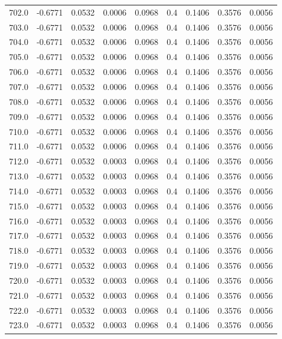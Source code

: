 \begin{longtable}{lrrrrrrrr}
702.0 & -0.6771 & 0.0532 & 0.0006 & 0.0968 & 0.4 & 0.1406 & 0.3576 & 0.0056 \\
703.0 & -0.6771 & 0.0532 & 0.0006 & 0.0968 & 0.4 & 0.1406 & 0.3576 & 0.0056 \\
704.0 & -0.6771 & 0.0532 & 0.0006 & 0.0968 & 0.4 & 0.1406 & 0.3576 & 0.0056 \\
705.0 & -0.6771 & 0.0532 & 0.0006 & 0.0968 & 0.4 & 0.1406 & 0.3576 & 0.0056 \\
706.0 & -0.6771 & 0.0532 & 0.0006 & 0.0968 & 0.4 & 0.1406 & 0.3576 & 0.0056 \\
707.0 & -0.6771 & 0.0532 & 0.0006 & 0.0968 & 0.4 & 0.1406 & 0.3576 & 0.0056 \\
708.0 & -0.6771 & 0.0532 & 0.0006 & 0.0968 & 0.4 & 0.1406 & 0.3576 & 0.0056 \\
709.0 & -0.6771 & 0.0532 & 0.0006 & 0.0968 & 0.4 & 0.1406 & 0.3576 & 0.0056 \\
710.0 & -0.6771 & 0.0532 & 0.0006 & 0.0968 & 0.4 & 0.1406 & 0.3576 & 0.0056 \\
711.0 & -0.6771 & 0.0532 & 0.0006 & 0.0968 & 0.4 & 0.1406 & 0.3576 & 0.0056 \\
712.0 & -0.6771 & 0.0532 & 0.0003 & 0.0968 & 0.4 & 0.1406 & 0.3576 & 0.0056 \\
713.0 & -0.6771 & 0.0532 & 0.0003 & 0.0968 & 0.4 & 0.1406 & 0.3576 & 0.0056 \\
714.0 & -0.6771 & 0.0532 & 0.0003 & 0.0968 & 0.4 & 0.1406 & 0.3576 & 0.0056 \\
715.0 & -0.6771 & 0.0532 & 0.0003 & 0.0968 & 0.4 & 0.1406 & 0.3576 & 0.0056 \\
716.0 & -0.6771 & 0.0532 & 0.0003 & 0.0968 & 0.4 & 0.1406 & 0.3576 & 0.0056 \\
717.0 & -0.6771 & 0.0532 & 0.0003 & 0.0968 & 0.4 & 0.1406 & 0.3576 & 0.0056 \\
718.0 & -0.6771 & 0.0532 & 0.0003 & 0.0968 & 0.4 & 0.1406 & 0.3576 & 0.0056 \\
719.0 & -0.6771 & 0.0532 & 0.0003 & 0.0968 & 0.4 & 0.1406 & 0.3576 & 0.0056 \\
720.0 & -0.6771 & 0.0532 & 0.0003 & 0.0968 & 0.4 & 0.1406 & 0.3576 & 0.0056 \\
721.0 & -0.6771 & 0.0532 & 0.0003 & 0.0968 & 0.4 & 0.1406 & 0.3576 & 0.0056 \\
722.0 & -0.6771 & 0.0532 & 0.0003 & 0.0968 & 0.4 & 0.1406 & 0.3576 & 0.0056 \\
723.0 & -0.6771 & 0.0532 & 0.0003 & 0.0968 & 0.4 & 0.1406 & 0.3576 & 0.0056 \\

\end{longtable}
